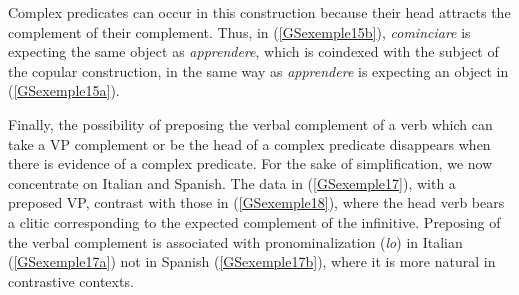 \documentclass[output=paper
                ,modfonts
                ,nonflat
	        ,collection
	        ,collectionchapter
	        ,collectiontoclongg
 	        ,biblatex
                ,babelshorthands
                ,newtxmath
                ,draftmode
                ,colorlinks, citecolor=brown
]{./langsci/langscibook}
\begin{document}
{Complex predicates can occur in this construction because their head attracts the complement of their complement. Thus, in (\ref{GSexemple15b}), \emph{cominciare} is expecting the same object as \emph{apprendere}, which is coindexed with the subject of the copular construction, in the same way as \emph{apprendere} is expecting an object in (\ref{GSexemple15a}). 

Finally, the possibility of preposing the verbal complement of a verb which can take a VP complement or be the head of a complex predicate disappears when there is evidence of a complex predicate. For the sake of simplification, we now concentrate on Italian and Spanish. The data in (\ref{GSexemple17}), with a preposed VP, contrast with those in (\ref{GSexemple18}), where the head verb bears a clitic corresponding to the expected complement of the infinitive. Preposing of the verbal complement is associated with pronominalization (\emph{lo}) in Italian (\ref{GSexemple17a}) not in Spanish (\ref{GSexemple17b}), where it is more natural in contrastive contexts.

\begin{exe}
	\label{GSexemple17} 
	\begin{xlist}
	\label{GSexemple17a}
		 
	\label{GSexemple17b}
	\end{xlist}
\end{exe}

\eal
	\label{GSexemple18} 
    \label{GSexemple18a} 	
	
	\label{GSexemple18b}
\zl

}
\end{document}
